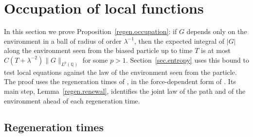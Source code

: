 \documentclass[11pt]{amsart}
\theoremstyle{definition}
\theoremstyle{remark}
\numberwithin{equation}{section}
\newcommand{\Q}{\mathbb Q}
\begin{document}
\section{Occupation of local functions}\label{regen.sec}

In this section we prove Proposition~\ref{regen.occupation}: if $G$ depends only on the environment in a ball of radius of order $\lambda^{-1}$, then the expected integral of $|G|$ along the environment seen from the biased particle up to time $T$ is at most $C(T+\lambda^{-2})\|G\|_{L^p(\Q)}$ for some $p>1$. Section~\ref{sec.entropy} uses this bound to test local equations against the law of the environment seen from the particle. The proof uses the regeneration times of \citet*{ballistic2003shen}, in the force-dependent form of \citet[Section~5]{Einstein2012gantert}. Its main step, Lemma~\ref{regen.renewal}, identifies the joint law of the path and of the environment ahead of each regeneration time.

\subsection{Regeneration times}\label{regen.setup}
\end{document}
